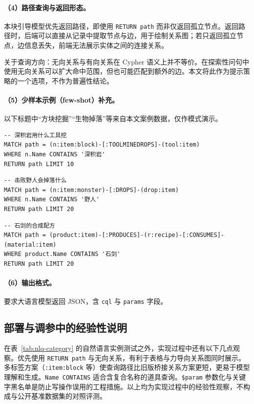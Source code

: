 \paragraph{（4）路径查询与返回形态。}
本块引导模型优先返回路径，即使用 \texttt{RETURN path} 而非仅返回孤立节点。返回路径时，后端可以直接从记录中提取节点与边，用于绘制关系图；若只返回孤立节点，边信息丢失，前端无法展示实体之间的连接关系。

关于查询方向：无向关系与有向关系在 Cypher 语义上并不等价。在探索性问句中使用无向关系可以扩大命中范围，但也可能匹配到额外的边。本文将此作为提示策略的一个选项，不作为普遍性结论。

\paragraph{（5）少样本示例（few-shot）补充。}
以下标题中“方块挖掘”“生物掉落”等来自本文案例数据，仅作模式演示。

\begin{lstlisting}[language=cypher, caption={方块挖掘（无方向路径）}]
-- 深积岩用什么工具挖
MATCH path = (n:item:block)-[:TOOLMINEDROPS]-(tool:item)
WHERE n.Name CONTAINS '深积岩'
RETURN path LIMIT 10
\end{lstlisting}

\begin{lstlisting}[language=cypher, caption={生物掉落（无方向路径）}]
-- 击败野人会掉落什么
MATCH path = (n:item:monster)-[:DROPS]-(drop:item)
WHERE n.Name CONTAINS '野人'
RETURN path LIMIT 20
\end{lstlisting}

\begin{lstlisting}[language=cypher, caption={配方原料（无方向路径）}]
-- 石剑的合成配方
MATCH path = (product:item)-[:PRODUCES]-(r:recipe)-[:CONSUMES]-(material:item)
WHERE product.Name CONTAINS '石剑'
RETURN path LIMIT 20
\end{lstlisting}

\paragraph{（6）输出格式。}
要求大语言模型返回 JSON，含 \texttt{cql} 与 \texttt{params} 字段。

\subsection{部署与调参中的经验性说明}

在表~\ref{tab:nlq-category} 的自然语言实例测试之外，实现过程中还有以下几点观察。优先使用 \texttt{RETURN path} 与无向关系，有利于表格与力导向关系图同时展示。多标签方案（\texttt{:item:block} 等）使查询路径比旧版桥接关系方案更短，更易于模型理解和生成。\texttt{Name CONTAINS} 适合含复合名称的道具查询。\texttt{\$param} 参数化与关键字黑名单是防止写操作误用的工程措施。以上均为实现过程中的经验性观察，不构成与公开基准数据集的对照评测。

